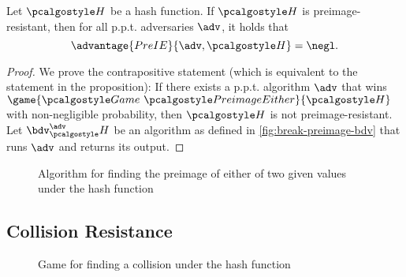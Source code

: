 \begin{proposition}
  Let $\algo{H}$ be a hash function. If $\algo{H}$ is preimage-resistant, then for all p.p.t. adversaries $\adv$, it holds that
  \[
  \advantage{PreIE}{\adv, \algo{H}} = \negl.
  \]
\end{proposition}
\begin{proof}
  We prove the contrapositive statement (which is equivalent to the statement in the proposition):
  If there exists a p.p.t. algorithm $\adv$ that wins $\game{\Game~\algo{PreimageEither}}{\algo{H}}$ with non-negligible probability, then $\algo{H}$ is not preimage-resistant.
  Let $\bdv^\adv_\algo{H}$ be an algorithm as defined in \autoref{fig:break-preimage-bdv} that runs $\adv$ and returns its output.
\end{proof}
\begin{figure}[tbhp]
  \begin{center}
    \begin{tcolorbox}[width=5cm]
      \begin{pchstack}[center]
      \end{pchstack}
    \end{tcolorbox}
  \end{center}
  \caption{Algorithm for finding the preimage of either of two given values under the hash function \label{fig:break-preimage-bdv}}
  \end{figure}


\subsection{Collision Resistance}

\begin{figure}[tbhp]
  \begin{center}
    \begin{tcolorbox}[width=8cm]
      \begin{pchstack}[center]
      \end{pchstack}
    \end{tcolorbox}
  \end{center}
  \caption{Game for finding a collision under the hash function \label{fig:break-hash-collision}}
\end{figure}

